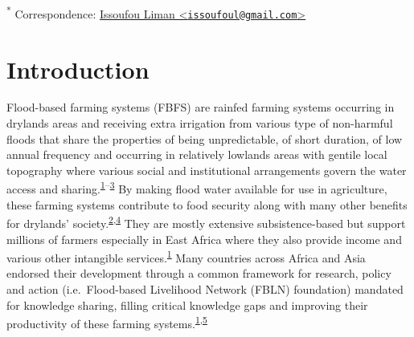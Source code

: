 \documentclass[12pt,oneside]{article}
\begin{document}
\textsuperscript{*} Correspondence: \href{mailto:issoufoul@gmail.com}{Issoufou Liman \textless{}\href{mailto:issoufoul@gmail.com}{\nolinkurl{issoufoul@gmail.com}}\textgreater{}}

\hypertarget{intro}{%
\section{Introduction}\label{intro}}

Flood-based farming systems (FBFS) are rainfed farming systems occurring in drylands areas and receiving extra irrigation from various type of non-harmful floods that share the properties of being unpredictable, of short duration, of low annual frequency and occurring in relatively lowlands areas with gentile local topography where various social and institutional arrangements govern the water access and sharing.\textsuperscript{\protect\hyperlink{ref-Puertas_et_al_2011}{1}--\protect\hyperlink{ref-Varisco_1983}{3}} By making flood water available for use in agriculture, these farming systems contribute to food security along with many other benefits for drylands' society.\textsuperscript{\protect\hyperlink{ref-VanSteenbergen_et_al_2010}{2},\protect\hyperlink{ref-Xing_et_al_2014}{4}} They are mostly extensive subsistence-based but support millions of farmers especially in East Africa where they also provide income and various other intangible services.\textsuperscript{\protect\hyperlink{ref-Puertas_et_al_2011}{1}} Many countries across Africa and Asia endorsed their development through a common framework for research, policy and action (i.e.~Flood-based Livelihood Network (FBLN) foundation) mandated for knowledge sharing, filling critical knowledge gaps and improving their productivity of these farming systems.\textsuperscript{\protect\hyperlink{ref-Puertas_et_al_2011}{1},\protect\hyperlink{ref-FBLN_2018}{5}}
\end{document}
